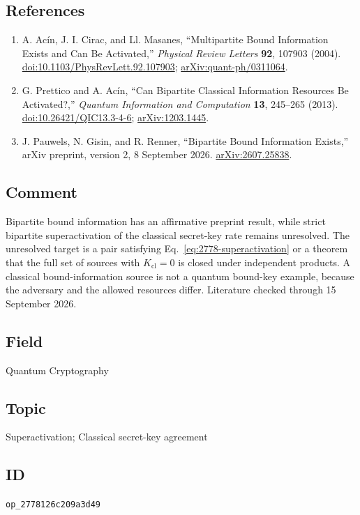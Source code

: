 \subsection*{References}

\begin{enumerate}[label={},leftmargin=4.8em,labelsep=0.5em]
  \footnotesize
  \item[\textup{[ACM04]}]\label{ref:2778-acm}
  A. Ac\'in, J. I. Cirac, and Ll. Masanes, ``Multipartite Bound Information
  Exists and Can Be Activated,'' \emph{Physical Review Letters} \textbf{92},
  107903 (2004).
  \href{https://doi.org/10.1103/PhysRevLett.92.107903}{doi:10.1103/PhysRevLett.92.107903};
  \href{https://arxiv.org/abs/quant-ph/0311064}{arXiv:quant-ph/0311064}.

  \item[\textup{[PA13]}]\label{ref:2778-pa}
  G. Prettico and A. Ac\'in, ``Can Bipartite Classical Information
  Resources Be Activated?,'' \emph{Quantum Information and Computation}
  \textbf{13}, 245--265 (2013).
  \href{https://doi.org/10.26421/QIC13.3-4-6}{doi:10.26421/QIC13.3-4-6};
  \href{https://arxiv.org/abs/1203.1445}{arXiv:1203.1445}.

  \item[\textup{[PGR26]}]\label{ref:2778-pgr}
  J. Pauwels, N. Gisin, and R. Renner, ``Bipartite Bound Information
  Exists,'' arXiv preprint, version 2, 8 September 2026.
  \href{https://arxiv.org/abs/2607.25838}{arXiv:2607.25838}.
\end{enumerate}

\subsection*{Comment}

Bipartite bound information has an affirmative preprint result, while
strict bipartite superactivation of the classical secret-key rate remains
unresolved.  The unresolved target is a pair satisfying
Eq.~\eqref{eq:2778-superactivation} or a theorem that the full set of sources
with $K_{\mathrm{cl}}=0$ is closed under independent products.  A classical
bound-information source is not a quantum bound-key example, because the
adversary and the allowed resources differ.  Literature checked through 15 September 2026.

\subsection*{Field}

Quantum Cryptography

\subsection*{Topic}

Superactivation; Classical secret-key agreement

\subsection*{ID}

\texttt{op\_2778126c209a3d49}
